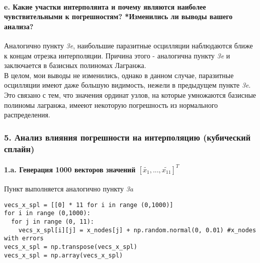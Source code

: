 \paragraph{e. Какие участки интерполянта и почему являются наиболее чувствительными к погрешностям? *Изменились ли выводы вашего анализа? \\}
\begin{flushleft}
Аналогично пункту \textit{3e}, наибольшие паразитные осцилляции наблюдаются ближе к концам отрезка интерполяции. Причина этого - аналогична пункту \textit{3e} и заключается в базисных полиномах Лагранжа. \\
В целом, мои выводы не изменились, однако в данном случае, паразитные осцилляции имеют даже большую видимость, нежели в предыдущем пункте \textit{3e}. Это связано с тем, что значения ординат узлов, на которые умножаются базисные полиномы лагранжа, имееют некоторую погрешность из нормального распределения.
\end{flushleft}
\subsubsection{5. Анализ влияния погрешности на интерполяцию (кубический сплайн)}
\paragraph{1.a. Генерация 1000 векторов значений $[\tilde{x_1}, ..., \tilde{x_{11}}]^T$ \\} 
\begin{flushleft}
Пункт выполняется аналогично пункту \textit{3a}
\end{flushleft}
\begin{lstlisting}
vecs_x_spl = [[0] * 11 for i in range (0,1000)]
for i in range (0,1000):
  for j in range (0, 11):
    vecs_x_spl[i][j] = x_nodes[j] + np.random.normal(0, 0.01) #x_nodes with errors
vecs_x_spl = np.transpose(vecs_x_spl)
vecs_x_spl = np.array(vecs_x_spl)
\end{lstlisting}
